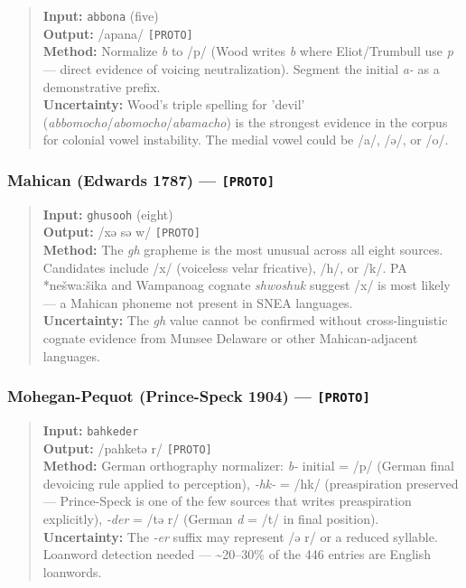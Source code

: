 \begin{quote}
\textbf{Input:} \texttt{abbona} (five) \\
\textbf{Output:} /apana/ \texttt{[PROTO]} \\
\textbf{Method:} Normalize \textit{b} to /p/ (Wood writes \textit{b} where
Eliot/Trumbull use \textit{p} --- direct evidence of voicing neutralization).
Segment the initial \textit{a-} as a demonstrative prefix. \\
\textbf{Uncertainty:} Wood's triple spelling for 'devil'
(\textit{abbomocho}/\textit{abomocho}/\textit{abamacho}) is the strongest
evidence in the corpus for colonial vowel instability. The medial vowel
could be /a/, /ə/, or /o/.
\end{quote}

\subsubsection*{Mahican (Edwards 1787) --- \texttt{[PROTO]}}

\begin{quote}
\textbf{Input:} \texttt{ghusooh} (eight) \\
\textbf{Output:} /xə sə w/ \texttt{[PROTO]} \\
\textbf{Method:} The \textit{gh} grapheme is the most unusual across all eight
sources. Candidates include /x/ (voiceless velar fricative), /h/, or /k/.
PA *nešwa:šika and Wampanoag cognate \textit{shwoshuk} suggest /x/
is most likely --- a Mahican phoneme not present in SNEA languages. \\
\textbf{Uncertainty:} The \textit{gh} value cannot be confirmed without
cross-linguistic cognate evidence from Munsee Delaware or other Mahican-adjacent
languages.
\end{quote}

\subsubsection*{Mohegan-Pequot (Prince-Speck 1904) --- \texttt{[PROTO]}}

\begin{quote}
\textbf{Input:} \texttt{bahkeder} \\
\textbf{Output:} /pahketə r/ \texttt{[PROTO]} \\
\textbf{Method:} German orthography normalizer: \textit{b-} initial = /p/
(German final devoicing rule applied to perception), \textit{-hk-} = /hk/
(preaspiration preserved --- Prince-Speck is one of the few sources that
writes preaspiration explicitly), \textit{-der} = /tə r/ (German
\textit{d} = /t/ in final position). \\
\textbf{Uncertainty:} The \textit{-er} suffix may represent /ə r/ or
a reduced syllable. Loanword detection needed --- \textasciitilde20--30\% of
the 446 entries are English loanwords.
\end{quote}

